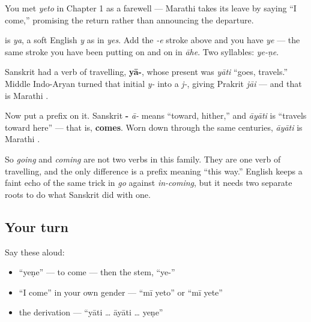 You met \emph{yeto} in Chapter 1 as a farewell — Marathi takes its leave by saying \textquotedblleft{}I come,\textquotedblright{} promising the return rather than announcing the departure.

\begin{sounds}
\textbf{} is \emph{ya}, a soft English \emph{y} as in \emph{yes}. Add the \emph{-e} stroke above and you have \textbf{} \emph{ye} — the same stroke you have been putting on \textbf{} and on \textbf{} in \emph{āhe}. Two syllables: \emph{ye-ṇe}.
\end{sounds}

\begin{cousinweb}
Sanskrit had a verb of travelling, \textbf{yā-}, whose present was \textbf{} \emph{yāti} \textquotedblleft{}goes, travels.\textquotedblright{} Middle Indo-Aryan turned that initial \emph{y-} into a \emph{j-}, giving Prakrit \emph{jāi} — and that is Marathi \textbf{}.

Now put a prefix on it. Sanskrit \textbf{-} \emph{ā-} means \textquotedblleft{}toward, hither,\textquotedblright{} and \textbf{} \emph{āyāti} is \textquotedblleft{}travels toward here\textquotedblright{} — that is, \textbf{comes}. Worn down through the same centuries, \emph{āyāti} is Marathi \textbf{}.

So \emph{going} and \emph{coming} are not two verbs in this family. They are one verb of travelling, and the only difference is a prefix meaning \textquotedblleft{}this way.\textquotedblright{} English keeps a faint echo of the same trick in \emph{go} against \emph{in-coming}, but it needs two separate roots to do what Sanskrit did with one.
\end{cousinweb}

\subsection*{Your turn}
Say these aloud:

\begin{itemize}
\raggedright
  \item \textquotedblleft{}yeṇe\textquotedblright{} — to come — then the stem, \textquotedblleft{}ye-\textquotedblright{}
  \item \textquotedblleft{}I come\textquotedblright{} in your own gender — \textquotedblleft{}mī yeto\textquotedblright{} or \textquotedblleft{}mī yete\textquotedblright{}
  \item the derivation — \textquotedblleft{}yāti … āyāti … yeṇe\textquotedblright{}
\end{itemize}

